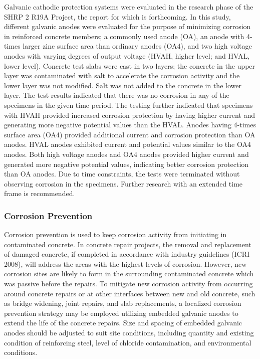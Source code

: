 Galvanic cathodic protection systems were evaluated in the research phase of the SHRP 2 R19A Project, the report for which is forthcoming. In this study, different galvanic anodes were evaluated for the purpose of minimizing corrosion in reinforced concrete members; a commonly used anode (OA), an anode with 4-times larger zinc surface area than ordinary anodes (OA4), and two high voltage anodes with varying degrees of output voltage (HVAH, higher level; and HVAL, lower level). Concrete test slabs were cast in two layers; the concrete in the upper layer was contaminated with salt to accelerate the corrosion activity and the lower layer was not modified. Salt was not added to the concrete in the lower layer. The test results indicated that there was no corrosion in any of the specimens in the given time period. The testing further indicated that specimens with HVAH provided increased corrosion protection by having higher current and generating more negative potential values than the HVAL.  Anodes having 4-times surface area (OA4) provided additional current and corrosion protection than OA anodes. HVAL anodes exhibited current and potential values similar to the OA4 anodes. Both high voltage anodes and OA4 anodes provided higher current and generated more negative potential values, indicating better corrosion protection than OA anodes. Due to time constraints, the tests were terminated without observing corrosion in the specimens.
Further research with an extended time frame is recommended.

\subsubsection{Corrosion Prevention}
Corrosion prevention is used to keep corrosion activity from initiating in contaminated concrete. In concrete repair projects, the removal and replacement of damaged concrete, if completed in accordance with industry guidelines (ICRI 2008), will address the areas with the highest levels of corrosion. However, new corrosion sites are likely to form in the surrounding contaminated concrete which was passive before the repairs. To mitigate new corrosion activity from occurring around concrete repairs or at other interfaces between new and old concrete, such as bridge widening, joint repairs, and slab replacements, a localized corrosion prevention strategy may be employed utilizing embedded galvanic anodes to extend the life of the concrete repairs. Size and spacing of embedded galvanic anodes should be adjusted to suit site conditions, including quantity and existing condition of reinforcing steel, level of chloride contamination, and environmental conditions.

